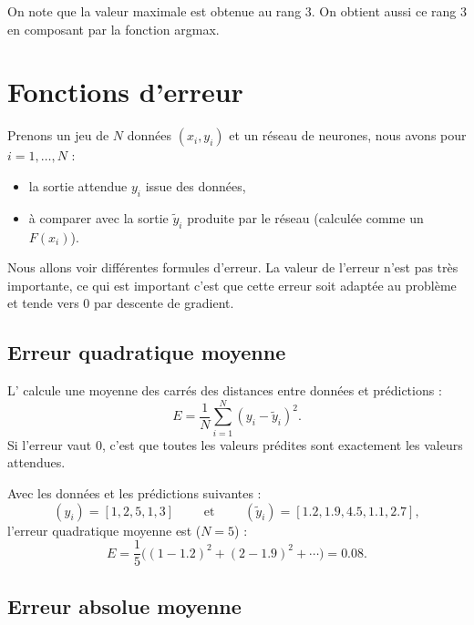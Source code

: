 \documentclass[11pt,class=report,crop=false]{standalone}
\begin{document}
On note que la valeur maximale est obtenue au rang $3$. On obtient aussi ce rang $3$ en composant par la fonction argmax.


\section{Fonctions d'erreur}


Prenons un jeu de $N$ données $(x_i,y_i)$ et un réseau de neurones, nous avons pour $i=1,\ldots,N$ :
\begin{itemize}
  \item la sortie attendue $y_i$ issue des données,
  \item à comparer avec la sortie $\widetilde y_i$ produite par le réseau (calculée comme un $F(x_i)$). 
\end{itemize}

Nous allons voir différentes formules d'erreur. La valeur de l'erreur n'est pas très importante, ce qui est important c'est que cette erreur soit adaptée au problème et tende vers $0$ par descente de gradient.

\subsection{Erreur quadratique moyenne}

L' calcule une moyenne des carrés des distances entre données et prédictions :
$$E = \frac{1}{N} \sum_{i=1}^N (y_i-\widetilde y_i)^2.$$
Si l'erreur vaut $0$, c'est que toutes les valeurs prédites sont exactement les valeurs attendues.
  
\begin{exemple}
Avec les données et les prédictions suivantes : 
$$(y_i) =  [1, 2, 5, 1, 3]
\qquad \text{ et } \qquad
(\widetilde y_i) = [1.2, 1.9, 4.5, 1.1, 2.7],
$$
l'erreur quadratique moyenne est ($N=5$) : 
$$E = \frac{1}{5} \big( (1-1.2)^2+ (2-1.9)^2 + \cdots \big) = 0.08.$$
\end{exemple}

  
\subsection{Erreur absolue moyenne}
\end{document}
